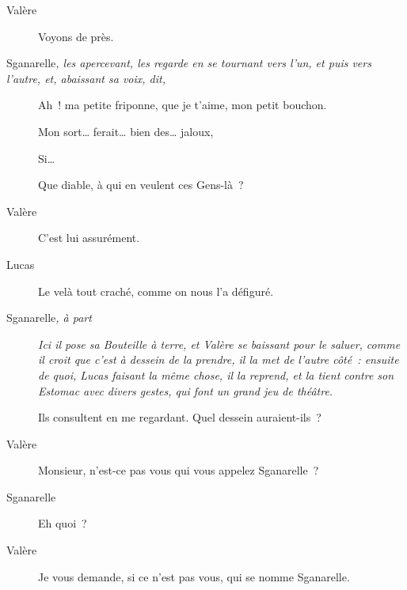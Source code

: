 \documentclass[french,twoside]{book} %
\begin{document}
 \begin{description} \item[Valère] 

Voyons de près.\end{description}
 \begin{description} \item[Sganarelle\textit{, les apercevant, les regarde en se tournant vers l’un, et puis vers l’autre, et, abaissant sa voix, dit,}\par
] 

Ah ! ma petite friponne, que je t’aime, mon petit bouchon.

Mon sort… ferait… bien des… jaloux,

Si…

Que diable, à qui en veulent ces Gens-là ?\end{description}
 \begin{description} \item[Valère] 

C’est lui assurément.\end{description}
 \begin{description} \item[Lucas] 

Le velà tout craché, comme on nous l’a défiguré.\end{description}
 \begin{description} \item[Sganarelle\textit{, à part}\par
] \textit{Ici il pose sa Bouteille à terre, et Valère se baissant pour le saluer, comme il croit que c’est à dessein de la prendre, il la met de l’autre côté : ensuite de quoi, Lucas faisant la même chose, il la reprend, et la tient contre son Estomac avec divers gestes, qui font un grand jeu de théâtre.} 

Ils consultent en me regardant. Quel dessein auraient-ils ?\end{description}
 \begin{description} \item[Valère] 

Monsieur, n’est-ce pas vous qui vous appelez Sganarelle ?\end{description}
 \begin{description} \item[Sganarelle] 

Eh quoi ?\end{description}
 \begin{description} \item[Valère] 

Je vous demande, si ce n’est pas vous, qui se nomme Sganarelle.\end{description}
\end{document}
